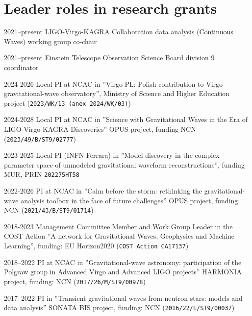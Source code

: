 \documentclass[]{friggeri-cv} %
\begin{document}
\section{Leader roles in research grants} 
\begin{entrylistoc}

\entrys 
{2021--present} 
{LIGO-Virgo-KAGRA Collaboration data analysis (Continuous Waves) working group co-chair} 

\entrys
{2021--present} 
{\href{https://indico.ego-gw.it/event/240/timetable/\#20210922}{Einstein Telescope Observation Science Board division 9} coordinator}

\entrys
{2024-2026} 
{Local PI at NCAC in ''Virgo-PL: Polish contribution to Virgo gravitational-wave observatory'', Ministry of Science and Higher Education project ({\tt 2023/WK/13 (anex 2024/WK/03)})}

\entrys
{2024-2028} 
{Local PI at NCAC in ''Science with Gravitational Waves in the Era of LIGO-Virgo-KAGRA Discoveries'' OPUS project, funding NCN ({\tt 2023/49/B/ST9/02777})}

\entrys
{2023-2025} 
{Local PI (INFN Ferrara) in ''Model discovery in the complex parameter space of unmodeled gravitational waveform reconstructions'', funding MUR, PRIN {\tt 202275HT58}}  

\entrys
{2022-2026} 
{PI at NCAC in ''Calm before the storm: rethinking the gravitational-wave analysis toolbox in the face of future challenges'' OPUS project, funding NCN ({\tt 2021/43/B/ST9/01714})}

\entrys 
{2018-2023} 
{Management Committee Member and Work Group Leader in the COST Action ''A network for Gravitational Waves, Geophysics and Machine Learning'', funding: EU Horizon2020 ({\tt COST Action CA17137}) } 
   
\entrys
{2018--2022}
{PI at NCAC in ''Gravitational-wave astronomy: participation of the Polgraw group in Advanced Virgo and Advanced LIGO projects'' HARMONIA project, funding: NCN ({\tt 2017/26/M/ST9/00978})}

\entrys
{2017--2022} 
{PI in ''Transient gravitational waves from neutron stars: models and data analysis'' SONATA BIS project, funding: NCN ({\tt 2016/22/E/ST9/00037})} 




\end{entrylistoc}
\end{document}
